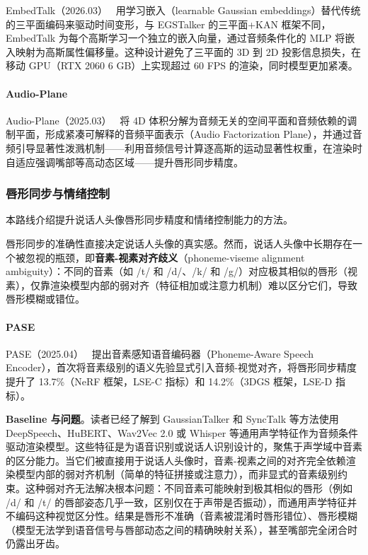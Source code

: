 EmbedTalk（2026.03）~\cite{2603_07604} 用学习嵌入（learnable Gaussian embeddings）替代传统的三平面编码来驱动时间变形，与 EGSTalker 的三平面+KAN 框架不同，EmbedTalk 为每个高斯学习一个独立的嵌入向量，通过音频条件化的 MLP 将嵌入映射为高斯属性偏移量。这种设计避免了三平面的 3D 到 2D 投影信息损失，在移动 GPU（RTX 2060 6 GB）上实现超过 60 FPS 的渲染，同时模型更加紧凑。

\paragraph{Audio-Plane}

Audio-Plane（2025.03）~\cite{2503_22605} 将 4D 体积分解为音频无关的空间平面和音频依赖的调制平面，形成紧凑可解释的音频平面表示（Audio Factorization Plane），并通过音频引导显著性泼溅机制——利用音频信号计算逐高斯的运动显著性权重，在渲染时自适应强调嘴部等高动态区域——提升唇形同步精度。

\subsubsection{唇形同步与情绪控制}

本路线介绍提升说话人头像唇形同步精度和情绪控制能力的方法。

唇形同步的准确性直接决定说话人头像的真实感。然而，说话人头像中长期存在一个被忽视的瓶颈，即\textbf{音素-视素对齐歧义}（phoneme-viseme alignment ambiguity）：不同的音素（如 /t/ 和 /d/、/k/ 和 /g/）对应极其相似的唇形（视素），仅靠渲染模型内部的弱对齐（特征相加或注意力机制）难以区分它们，导致唇形模糊或错位。

\paragraph{PASE}

PASE（2025.04）~\cite{2504_05803} 提出音素感知语音编码器（Phoneme-Aware Speech Encoder），首次将音素级别的语义先验显式引入音频-视觉对齐，将唇形同步精度提升了 13.7\%（NeRF 框架，LSE-C 指标）和 14.2\%（3DGS 框架，LSE-D 指标）。

\textbf{Baseline 与问题}。读者已经了解到 GaussianTalker 和 SyncTalk 等方法使用 DeepSpeech、HuBERT、Wav2Vec 2.0 或 Whisper 等通用声学特征作为音频条件驱动渲染模型。这些特征是为语音识别或说话人识别设计的，聚焦于声学域中音素的区分能力。当它们被直接用于说话人头像时，音素-视素之间的对齐完全依赖渲染模型内部的弱对齐机制（简单的特征拼接或注意力），而非显式的音素级别约束。这种弱对齐无法解决根本问题：不同音素可能映射到极其相似的唇形（例如 /d/ 和 /t/ 的唇部姿态几乎一致，区别仅在于声带是否振动），而通用声学特征并不编码这种视觉区分性。结果是唇形不准确（音素被混淆时唇形错位）、唇形模糊（模型无法学到语音信号与唇部动态之间的精确映射关系），甚至嘴部完全闭合时仍露出牙齿。

